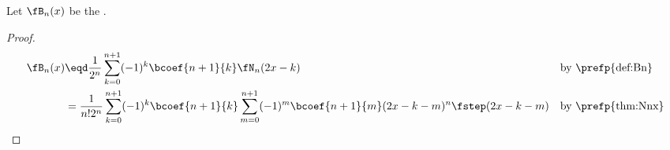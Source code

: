 \begin{proposition}
\label{prop:Bn}
Let $\fB_n(x)$ be the  .
\end{proposition}
\begin{proof}
\begin{align*}
  \fB_n(x)
    &\eqd \frac{1}{2^n}\sum_{k=0}^{n+1} (-1)^k \bcoef{n+1}{k} \fN_n(2x-k)
    && \text{by \prefp{def:Bn}}
  \\&= \frac{1}{n!2^n}\sum_{k=0}^{n+1} (-1)^k \bcoef{n+1}{k} \sum_{m=0}^{n+1} (-1)^m \bcoef{n+1}{m}(2x-k-m)^n \fstep(2x-k-m)
    && \text{by \prefp{thm:Nnx}}
\end{align*}
\end{proof}


